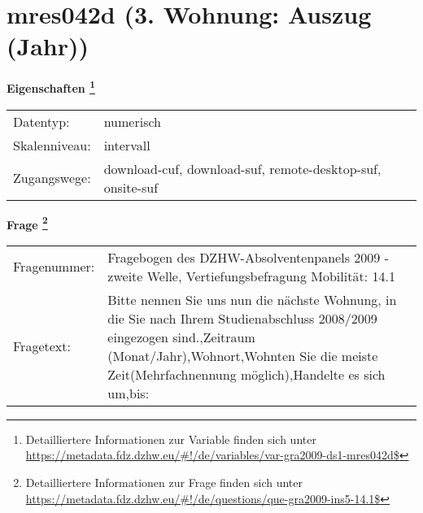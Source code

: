 
    \setcounter{footnote}{0}

    \vspace*{-1.8cm}
	\section{mres042d (3. Wohnung: Auszug (Jahr))}
	\label{section:mres042d}



    \vspace*{0.5cm}
    \noindent\textbf{Eigenschaften
	\footnote{Detailliertere Informationen zur Variable finden sich unter
		\url{https://metadata.fdz.dzhw.eu/\#!/de/variables/var-gra2009-ds1-mres042d$}}}\\
	\begin{tabularx}{\hsize}{@{}lX}
	Datentyp: & numerisch \\
	Skalenniveau: & intervall \\
	Zugangswege: &
	  download-cuf, 
	  download-suf, 
	  remote-desktop-suf, 
	  onsite-suf
 \\
    \end{tabularx}



				\vspace*{0.5cm}
                \noindent\textbf{Frage
	                \footnote{Detailliertere Informationen zur Frage finden sich unter
		              \url{https://metadata.fdz.dzhw.eu/\#!/de/questions/que-gra2009-ins5-14.1$}}}\\
				\begin{tabularx}{\hsize}{@{}lX}
					Fragenummer: &
					  Fragebogen des DZHW-Absolventenpanels 2009 - zweite Welle, Vertiefungsbefragung Mobilität:
					  14.1
 \\
					Fragetext: & Bitte nennen Sie uns nun die nächste Wohnung, in die Sie nach Ihrem Studienabschluss 2008/2009 eingezogen sind.,Zeitraum (Monat/Jahr),Wohnort,Wohnten Sie die meiste Zeit(Mehrfachnennung möglich),Handelte es sich um,bis: \\
				\end{tabularx}





